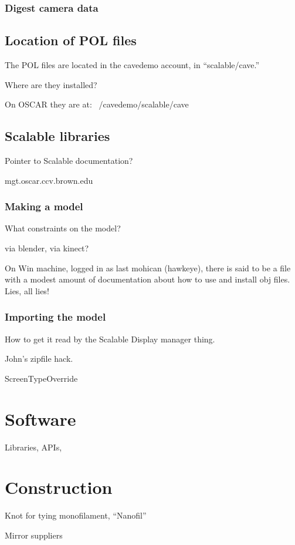\documentclass[11pt]{article}
\begin{document}
\subsubsection{Digest camera data}

\subsection{Location of POL files}

The POL files are located in the cavedemo account, in ``scalable/cave.''


Where are they installed?

On OSCAR they are at: ~/cavedemo/scalable/cave


\subsection{Scalable libraries}

Pointer to Scalable documentation?

mgt.oscar.ccv.brown.edu


\subsubsection{Making a model}

What constraints on the model?

via blender, via kinect?

On Win machine, logged in as last mohican (hawkeye), there is said to
be a file with a modest amount of documentation about how to use and
install obj files.  Lies, all lies!


\subsubsection{Importing the model}

How to get it read by the Scalable Display manager thing.

John's zipfile hack.


ScreenTypeOverride


\section{Software}

Libraries, APIs,


\section{Construction}

Knot for tying monofilament, ``Nanofil''

Mirror suppliers
\end{document}

